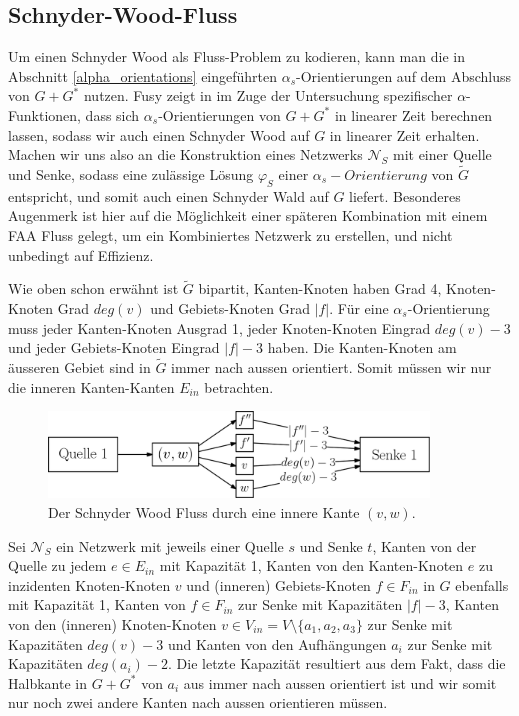 \subsection{Schnyder-Wood-Fluss}

Um einen Schnyder Wood als Fluss-Problem zu kodieren, kann man die in Abschnitt \ref{alpha_orientations} eingeführten $\alpha_s$-Orientierungen auf dem Abschluss von $G+G^*$ nutzen. Fusy zeigt in \cite{fusy07} im Zuge der Untersuchung spezifischer $\alpha$-Funktionen, dass sich $\alpha_s$-Orientierungen von $G+G^*$ in linearer Zeit berechnen lassen, sodass wir auch einen Schnyder Wood auf $G$ in linearer Zeit erhalten.\\

Machen wir uns also an die Konstruktion eines Netzwerks $\mathcal{N}_S$ mit einer Quelle und Senke, sodass eine zulässige Lösung $\varphi_S$ einer $\alpha_s-Orientierung$ von $\tilde{G}$ entspricht, und somit auch einen Schnyder Wald auf $G$ liefert. Besonderes Augenmerk ist hier auf die Möglichkeit einer späteren Kombination mit einem FAA Fluss gelegt, um ein Kombiniertes Netzwerk zu erstellen, und nicht unbedingt auf Effizienz.\

Wie oben schon erwähnt ist $\tilde{G}$ bipartit, Kanten-Knoten haben Grad 4, Knoten-Knoten Grad $deg(v)$ und Gebiets-Knoten Grad $|f|$. Für eine $\alpha_s$-Orientierung muss jeder Kanten-Knoten Ausgrad 1, jeder Knoten-Knoten Eingrad $deg(v)-3$ und jeder Gebiets-Knoten Eingrad $|f|-3$ haben. Die Kanten-Knoten am äusseren Gebiet sind in $\tilde{G}$ immer nach aussen orientiert. Somit müssen wir nur die inneren Kanten-Kanten $E_{in}$ betrachten. \

\begin{figure}[h]
	\centering
  \includegraphics[width=0.9\textwidth]{schnyder_flow.png}
  \caption{Der Schnyder Wood Fluss durch eine innere Kante $(v,w)$.}
  \label{schnyder_flow}
\end{figure}

Sei $\mathcal{N}_S$ ein Netzwerk mit jeweils einer Quelle $s$ und Senke $t$, Kanten von der Quelle zu jedem $e \in E_{in}$ mit Kapazität 1, Kanten von den Kanten-Knoten $e$ zu inzidenten Knoten-Knoten $v$ und (inneren) Gebiets-Knoten $f \in F_{in}$ in $G$ ebenfalls mit Kapazität 1, Kanten von $f \in F_{in}$ zur Senke mit Kapazitäten $|f|-3$, Kanten von den (inneren) Knoten-Knoten $v \in V_{in} = V \setminus \{a_1,a_2,a_3\}$ zur Senke mit Kapazitäten $deg(v)-3$ und Kanten von den Aufhängungen $a_i$ zur Senke mit Kapazitäten $deg(a_i)-2$. Die letzte Kapazität resultiert aus dem Fakt, dass die Halbkante in $G+G^*$ von $a_i$ aus immer nach aussen orientiert ist und wir somit nur noch zwei andere Kanten nach aussen orientieren müssen.

